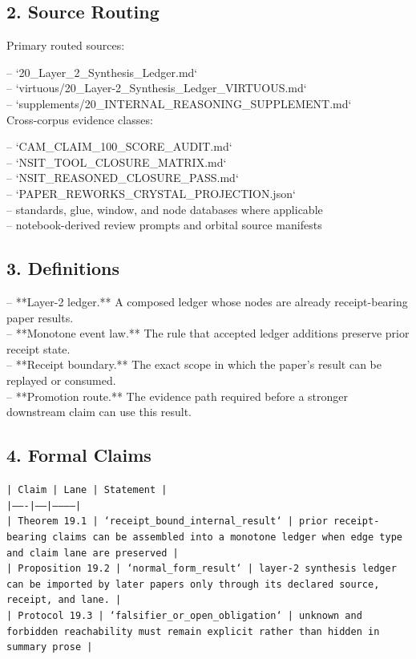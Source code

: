 \documentclass[11pt]{article}
\begin{document}
\subsection*{2. Source Routing}

Primary routed sources:

\noindent{}-- `20\_Layer\_2\_Synthesis\_Ledger.md`\\
\noindent{}-- `virtuous/20\_Layer-2\_Synthesis\_Ledger\_VIRTUOUS.md`\\
\noindent{}-- `supplements/20\_INTERNAL\_REASONING\_SUPPLEMENT.md`\\

Cross-corpus evidence classes:

\noindent{}-- `CAM\_CLAIM\_100\_SCORE\_AUDIT.md`\\
\noindent{}-- `NSIT\_TOOL\_CLOSURE\_MATRIX.md`\\
\noindent{}-- `NSIT\_REASONED\_CLOSURE\_PASS.md`\\
\noindent{}-- `PAPER\_REWORKS\_CRYSTAL\_PROJECTION.json`\\
\noindent{}-- standards, glue, window, and node databases where applicable\\
\noindent{}-- notebook-derived review prompts and orbital source manifests\\

\subsection*{3. Definitions}

\noindent{}-- **Layer-2 ledger.** A composed ledger whose nodes are already receipt-bearing paper results.\\
\noindent{}-- **Monotone event law.** The rule that accepted ledger additions preserve prior receipt state.\\
\noindent{}-- **Receipt boundary.** The exact scope in which the paper's result can be replayed or consumed.\\
\noindent{}-- **Promotion route.** The evidence path required before a stronger downstream claim can use this result.\\

\subsection*{4. Formal Claims}

\noindent\texttt{| Claim | Lane | Statement |}\\
\noindent\texttt{|-------|------|-----------|}\\
\noindent\texttt{| Theorem 19.1 | `receipt\_bound\_internal\_result` | prior receipt-bearing claims can be assembled into a monotone ledger when edge type and claim lane are preserved |}\\
\noindent\texttt{| Proposition 19.2 | `normal\_form\_result` | layer-2 synthesis ledger can be imported by later papers only through its declared source, receipt, and lane. |}\\
\noindent\texttt{| Protocol 19.3 | `falsifier\_or\_open\_obligation` | unknown and forbidden reachability must remain explicit rather than hidden in summary prose |}\\
\end{document}
